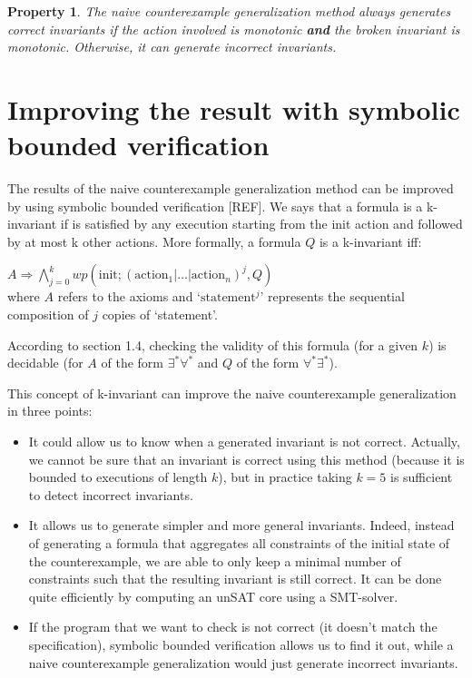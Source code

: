 \documentclass[11pt,a4paper,oldfontcommands,openany]{memoir}
\newtheorem*{property}{Property}
\begin{document}
    \begin{property}
        The naive counterexample generalization method always generates correct invariants if the action involved is monotonic
        \textbf{and} the broken invariant is monotonic.
        Otherwise, it can generate incorrect invariants.
    \end{property}

    \section{Improving the result with symbolic bounded verification}

    The results of the naive counterexample generalization method can be improved by using symbolic bounded verification [REF].
    We says that a formula is a k-invariant if is satisfied by any execution starting from the init action and followed by at most k
    other actions. More formally, a formula \(Q\) is a k-invariant iff:

    \( A \Rightarrow \bigwedge\limits_{j=0}^k wp(\text{init}; (\text{action}_1|\ldots|\text{action}_n)^j, Q) \)\\
    where \(A\) refers to the axioms and `\(\text{statement}^j\)' represents the sequential composition of \(j\) copies of `statement'.

    According to section 1.4, checking the validity of this formula (for a given \(k\)) is decidable (for \(A\) of the form \(\exists^*\forall^*\) and \(Q\) of the form \(\forall^*\exists^*\)).

    This concept of k-invariant can improve the naive counterexample generalization in three points:
    \begin{itemize}
        \item It could allow us to know when a generated invariant is not correct.
        Actually, we cannot be sure that an invariant is correct using this method (because it is bounded to executions of length \(k\)),
        but in practice taking \(k=5\) is sufficient to detect incorrect invariants.
        \item It allows us to generate simpler and more general invariants. Indeed, instead of generating a formula that
        aggregates all constraints of the initial state of the counterexample, we are able to only keep a minimal number of constraints
        such that the resulting invariant is still correct. It can be done quite efficiently by computing an unSAT core using a SMT-solver.
        \item If the program that we want to check is not correct (it doesn't match the specification), symbolic bounded verification
        allows us to find it out, while a naive counterexample generalization would just generate incorrect invariants.
    \end{itemize}
\end{document}
